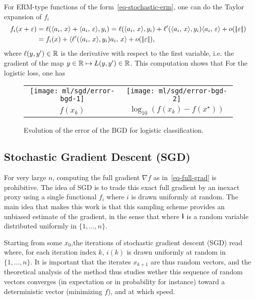 For ERM-type functions of the form~\eqref{eq-stochastic-erm}, one can do the Taylor expansion of $f_i$
\begin{align*}
	f_i(x+\varepsilon) &= \ell(\langle a_i,\,x\rangle + \langle a_i,\,\varepsilon\rangle,y_i)
	= \ell(\langle a_i,\,x\rangle,y_i) + \ell'(\langle a_i,\,x\rangle,y_i)\langle a_i,\,\varepsilon\rangle + o(|\!| \varepsilon |\!|) \\
	&= f_i(x) + \langle \ell'(\langle a_i,\,x\rangle,y_i) a_i,\,x\rangle + o(|\!| \varepsilon |\!|), 
\end{align*}
where $\ell( y,y' ) \in \mathbb{R}$ is the derivative with respect to the first variable, i.e. the gradient of the map $y \in \mathbb{R} \mapsto L(y,y') \in \mathbb{R}$. This computation shows that 
For the logistic loss, one has 



\begin{figure}
\centering
\begin{tabular}{cc}
\texttt{[image: ml/sgd/error-bgd-1]} &
\texttt{[image: ml/sgd/error-bgd-2]} \\
$f(x_k)$ & $\log_{10}(f(x_k)-f(x^\star))$ 
\end{tabular}
\caption{\label{fig-bgd}
Evolution of the error of the BGD for logistic classification.
}
\end{figure}



\subsection{Stochastic Gradient Descent (SGD)}

For very large $n$, computing the full gradient $\nabla f$ as in~\eqref{eq-full-grad} is prohibitive.  
%
The idea of SGD is to trade this exact full gradient by an inexact proxy using a single functional $f_{i}$ where $i$ is drawn uniformly at random. The main idea that makes this work is that this sampling scheme provides an unbiased estimate of the gradient, in the sense that
where $\mathrm{\bf i}$ is a random variable distributed uniformly in $\{1,\ldots,n\}$.

Starting from some $x_0$,the iterations of stochastic gradient descent (SGD) read
where, for each iteration index $k$, $i(k)$
is drawn uniformly at random in $\{1,\ldots,n\}$. 
%
It is important that the iterates $x_{k+1}$ are thus random vectors, and the theoretical analysis of the method thus studies wether this sequence of random vectors converges (in expectation or in probability for instance) toward a deterministic vector (minimizing $f$), and at which speed. 


